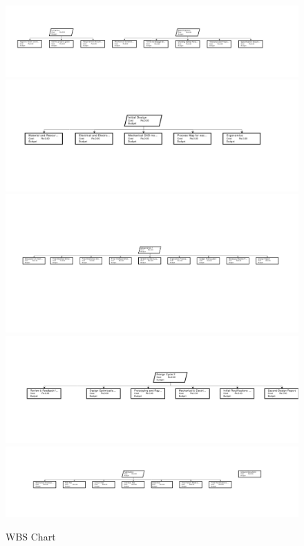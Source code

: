 \documentclass[12pt,a4paper]{article}
\begin{document}
\begin{figure}[H]
    \centering
    \includegraphics[width=1\textwidth]{WBS-1.png} %
    \includegraphics[width=1\textwidth]{WBS-2.png} %
    \includegraphics[width=1\textwidth]{WBS-3.png} %
    \includegraphics[width=1\textwidth]{WBS-4.png} %
    \includegraphics[width=1\textwidth]{WBS-5.png} %
    \caption{WBS Chart}
    
    \label{fig:GANTT CHART}
\end{figure}
\end{document}
